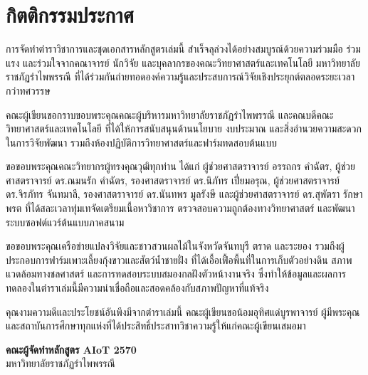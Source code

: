\chapter*{กิตติกรรมประกาศ}

การจัดทำตำราวิชาการและชุดเอกสารหลักสูตรเล่มนี้ สำเร็จลุล่วงได้อย่างสมบูรณ์ด้วยความร่วมมือ ร่วมแรง และร่วมใจจากคณาจารย์ นักวิจัย และบุคลากรของคณะวิทยาศาสตร์และเทคโนโลยี มหาวิทยาลัยราชภัฏรำไพพรรณี ที่ได้ร่วมกันถ่ายทอดองค์ความรู้และประสบการณ์วิจัยเชิงประยุกต์ตลอดระยะเวลากว่าทศวรรษ

คณะผู้เขียนขอกราบขอบพระคุณคณะผู้บริหารมหาวิทยาลัยราชภัฏรำไพพรรณี และคณบดีคณะวิทยาศาสตร์และเทคโนโลยี ที่ได้ให้การสนับสนุนด้านนโยบาย งบประมาณ และสิ่งอำนวยความสะดวกในการวิจัยพัฒนา รวมถึงห้องปฏิบัติการวิทยาศาสตร์และฟาร์มทดสอบต้นแบบ

ขอขอบพระคุณคณะวิทยากรผู้ทรงคุณวุฒิทุกท่าน ได้แก่ ผู้ช่วยศาสตราจารย์ อรรถกร คำฉัตร, ผู้ช่วยศาสตราจารย์ ดร.ณมนรัก คำฉัตร, รองศาสตราจารย์ ดร.นิภัทร เปี่ยมอรุณ, ผู้ช่วยศาสตราจารย์ ดร.จิรภัทร จันทมาลี, รองศาสตราจารย์ ดร.นันทพร มูลรังษี และผู้ช่วยศาสตราจารย์ ดร.สุพัตรา รักษาพรต ที่ได้สละเวลาทุ่มเทจัดเตรียมเนื้อหาวิชาการ ตรวจสอบความถูกต้องทางวิทยาศาสตร์ และพัฒนาระบบซอฟต์แวร์ต้นแบบภาคสนาม

ขอขอบพระคุณเครือข่ายแปลงวิจัยและชาวสวนผลไม้ในจังหวัดจันทบุรี ตราด และระยอง รวมถึงผู้ประกอบการฟาร์มเพาะเลี้ยงกุ้งขาวและสัตว์น้ำชายฝั่ง ที่ได้เอื้อเฟื้อพื้นที่ในการเก็บตัวอย่างดิน สภาพแวดล้อมทางชลศาสตร์ และการทดสอบระบบสมองกลฝังตัวหน้างานจริง ซึ่งทำให้ข้อมูลและผลการทดลองในตำราเล่มนี้มีความน่าเชื่อถือและสอดคล้องกับสภาพปัญหาที่แท้จริง

คุณงามความดีและประโยชน์อันพึงมีจากตำราเล่มนี้ คณะผู้เขียนขอน้อมอุทิศแด่บูรพาจารย์ ผู้มีพระคุณ และสถาบันการศึกษาทุกแห่งที่ได้ประสิทธิ์ประสาทวิชาความรู้ให้แก่คณะผู้เขียนเสมอมา

\vspace{1.5cm}
\begin{flushright}
    \textbf{คณะผู้จัดทำหลักสูตร AIoT 2570}\\
    มหาวิทยาลัยราชภัฏรำไพพรรณี
\end{flushright}
\clearpage
